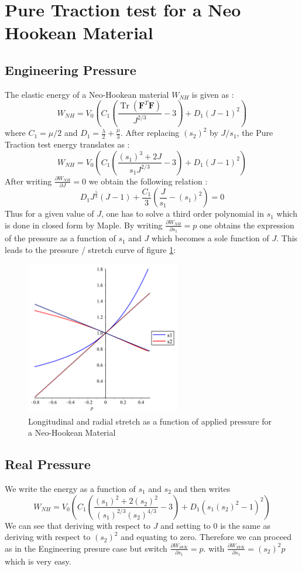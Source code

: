 \documentclass[a4paper,11pt]{article}
\newcommand{\defGrad}{{\mathbf F}}
\DeclareMathOperator{\Trace}{Tr}
\begin{document}
\section{Pure Traction test for a Neo Hookean Material}


\subsection{Engineering Pressure}
The elastic energy of a Neo-Hookean material $W_{NH}$ is given as :
\[
W_{NH} = V_0 (C_1 (\frac{\Trace (\defGrad^T \defGrad)}{J^{2/3}}-3) + D_1 (J-1)^2)
\]
where $C_1=\mu/2$ and $D_1=\frac{\lambda}{2}+\frac{\mu}{3}$. After replacing $(s_2)^2$ by $J/s_1$, the Pure Traction test energy translates as :
\[
W_{NH} = V_0 \left (C_1 \left (\frac{(s_1)^3 +2 J}{s_1 J^{2/3}}-3\right ) + D_1 \left (J-1\right)^2 \right)
\]
After writing $\frac{\partial W_{NH}}{\partial J}=0$ we obtain the following relation :
\[
D_1 J^{\frac{5}{3}}(J-1) + \frac{C_1}{3} \left (\frac{J}{s_1}-(s_1)^2\right )=0
\]
Thus for a given value of $J$, one has to solve a third order polynomial in $s_1$ which is done in closed form by Maple. By writing $\frac{\partial W_{NH}}{\partial s_1}=p$ one obtains the expression of the pressure as a function of $s_1$ and $J$ which becomes a sole function of $J$. 
 This leads to the   pressure / stretch curve of figure \ref{fig:PureTractionNH}:
\begin{figure}[!htbp]
	\centering
    \includegraphics[width=0.60\textwidth]{CurveNH}
	\caption{Longitudinal and radial stretch as a function of applied pressure for a Neo-Hookean Material}
	\label{fig:PureTractionNH}
\end{figure}

\subsection{Real Pressure}
We write the energy as a function of $s_1$ and $s_2$ and then writes 
\[
W_{NH} = V_0 \left (C_1 \left (\frac{(s_1)^2 +2 (s_2)^2}{ (s_1)^{2/3} (s_2)^{4/3}}-3\right ) + D_1 \left (s_1(s_2)^2-1\right)^2 \right)
\]
We can see that deriving with respect to $J$ and setting to 0 is the same as deriving with respect to $(s_2)^2$ and equating to zero.
Therefore we can proceed as in the Engineering presure case but switch $\frac{\partial W_{SVK}}{\partial s_1}=p$. with $\frac{\partial W_{SVK}}{\partial s_1}=(s_2)^2 p$ which is very easy.
\end{document}
